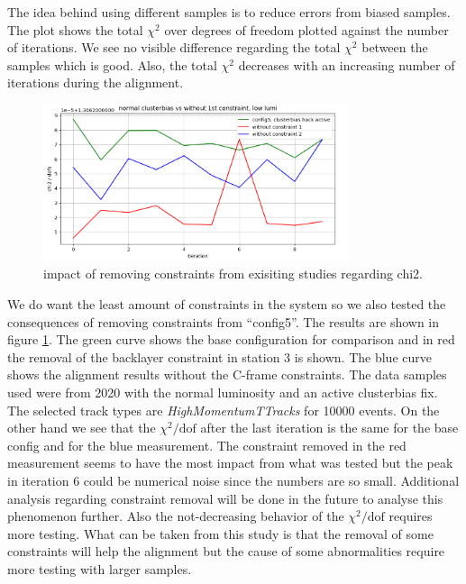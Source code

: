 The idea behind using different samples is to reduce errors
from biased samples. The plot shows the total $\chi^2$ over degrees of freedom
plotted against the number of iterations. We see no visible difference regarding
the total $\chi^2$ between the samples which is good.
Also, the total $\chi^2$ decreases with an increasing number of iterations
during the alignment.

\begin{figure}
  \centering
  \includegraphics[width=0.8\textwidth]{plots/feb_6_2022/low_lumi_removed_constraints_vs_normal.png}
  \caption{impact of removing constraints from exisiting studies regarding chi2.}
  \label{fig:removeConst}
\end{figure}

We do want the least amount of constraints in the system so we also tested
the consequences of removing constraints from ``config5''.
The results are shown in figure \ref{fig:removeConst}.
The green curve shows the base configuration for comparison and in red the removal of the backlayer constraint in station 3 is shown. The blue curve shows the alignment results without the C-frame constraints.
The data samples used were from 2020 with the normal luminosity and an active clusterbias fix.
The selected track types are \textit{HighMomentumTTracks} for 10000 events.
On the other hand we see that the $\chi^2 / \text{dof}$ after the last iteration is the same for the base config and for the blue measurement. The constraint removed in the red measurement seems to have the most impact from what was tested but the peak in iteration 6 could be numerical noise since the numbers are so small. Additional analysis regarding constraint removal will be done in the future to analyse this phenomenon further.
Also the not-decreasing behavior of the  $\chi^2 / \text{dof}$ requires more testing.
What can be taken from this study is that the removal of some constraints will help
the alignment but the cause of some abnormalities require more testing with larger samples.
